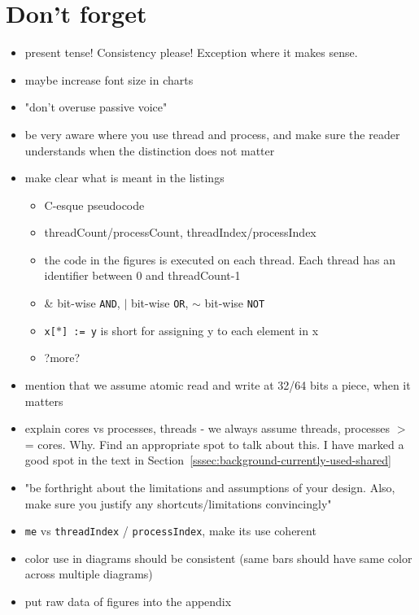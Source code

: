 \documentclass[a4paper, 10pt]{article}
\begin{document}
\section{Don't forget}
\begin{itemize}
	\item present tense! Consistency please! Exception where it makes sense.
	\item maybe increase font size in charts
	\item "don't overuse passive voice"
	\item be very aware where you use thread and process, and make sure the reader understands when the distinction does not matter
	\item make clear what is meant in the listings
		\begin{itemize}
			\item C-esque pseudocode
			\item threadCount/processCount,  threadIndex/processIndex
			\item the code in the figures is executed on each thread. Each thread has an identifier between 0 and threadCount-1
			\item \& bit-wise \texttt{AND}, $|$ bit-wise \texttt{OR}, $\sim$ bit-wise \texttt{NOT}
			\item \texttt{x[$*$] := y} is short for assigning y to each element in x
			\item ?more?
		\end{itemize}
	\item mention that we assume atomic read and write at 32/64 bits a piece, when it matters
	\item explain cores vs processes, threads - we always assume threads, processes $>$= cores. Why. Find an appropriate spot to talk about this. I have marked a good spot in the text in Section~\ref{sssec:background-currently-used-shared}
	\item "be forthright about the limitations and assumptions of your design. Also, make sure you justify any shortcuts/limitations convincingly"
	\item \texttt{me} vs \texttt{threadIndex} / \texttt{processIndex}, make its use coherent
	\item color use in diagrams should be consistent (same bars should have same color across multiple diagrams)
	\item put raw data of figures into the appendix
\end{itemize}

\end{document}
